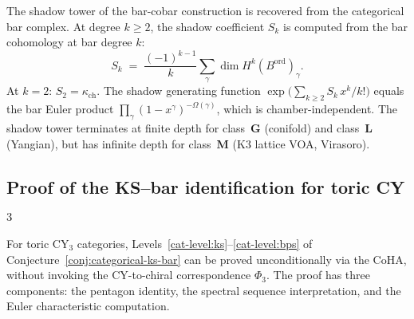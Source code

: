 \begin{remark}
\label{rem:categorical-shadow-bridge}
The shadow tower of the bar-cobar construction is recovered from the categorical bar complex. At degree $k \geq 2$, the shadow coefficient $S_k$ is computed from the bar cohomology at bar degree $k$:
\[
 S_k \;=\; \frac{(-1)^{k-1}}{k} \sum_\gamma \dim H^k(B^{\mathrm{ord}})_\gamma.
\]
At $k = 2$: $S_2 = \kappa_{\mathrm{ch}}$. The shadow generating function $\exp\!\bigl(\sum_{k \geq 2} S_k \, x^k / k!\bigr)$ equals the bar Euler product $\prod_\gamma (1 - x^\gamma)^{-\Omega(\gamma)}$, which is chamber-independent. The shadow tower terminates at finite depth for class~$\mathbf{G}$ (conifold) and class~$\mathbf{L}$ (Yangian), but has infinite depth for class~$\mathbf{M}$ (K3 lattice VOA, Virasoro).
\end{remark}


\subsection{Proof of the KS--bar identification for toric CY\texorpdfstring{$_3$}{-3}}
\label{sec:ks-bar-proof}

For toric CY$_3$ categories, Levels~\ref{cat-level:ks}--\ref{cat-level:bps} of Conjecture~\ref{conj:categorical-ks-bar} can be proved unconditionally via the CoHA, without invoking the CY-to-chiral correspondence $\Phi_3$.  The proof has three components: the pentagon identity, the spectral sequence interpretation, and the Euler characteristic computation.

